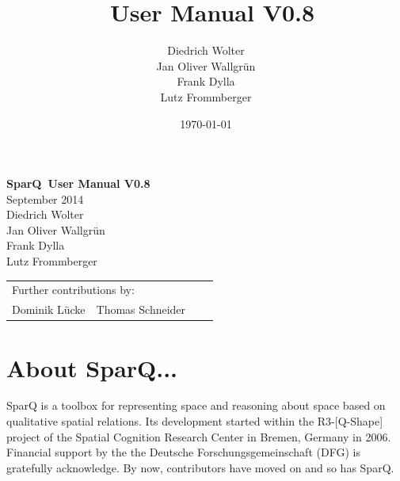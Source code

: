 \documentclass[headsepline]{scrreprt}
\title{\engine\ User Manual V0.8}
\author{Diedrich Wolter\\ Jan Oliver Wallgr{\"u}n \\ Frank Dylla\\ Lutz Frommberger}
\date{\today}
\theoremstyle{definition}
\newcommand{\qshape}{R3-[Q-Shape]}
\newcommand{\engine}{SparQ}
\begin{document}

\begin{titlepage}
\begin{center}
{\huge \bfseries{\engine\ User Manual V0.8\\}}
\bigskip
{\LARGE September 2014\\ \bigskip
Diedrich Wolter\\ Jan Oliver Wallgr{\"u}n \\ Frank Dylla\\ Lutz Frommberger\\
}
\end{center}
\vfill
\begin{tabular}{llll}
\multicolumn{2}{l}{Further contributions by:}\\[1ex]
Dominik L\"ucke & Thomas Schneider &  & \\
\end{tabular}
\vfill
\end{titlepage}
\tableofcontents


\chapter*{About SparQ...}


\engine{} is a toolbox for representing space and reasoning about
space based on  qualitative spatial relations. Its development started
within the \qshape{} project of the Spatial Cognition Research Center in Bremen, Germany in 2006.
Financial support by the the Deutsche Forschungsgemeinschaft (DFG)  is gratefully acknowledge.
By now, contributors have moved on and so has \engine{}.
\end{document}

